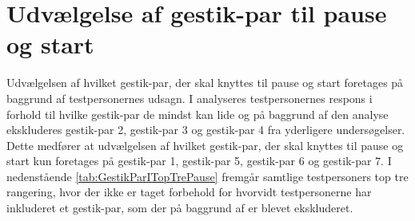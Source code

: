 \section{Udvælgelse af gestik-par til pause og start}
\label{TestresultaterPauseStart}
%
Udvælgelsen af hvilket gestik-par, der skal knyttes til pause og start foretages på baggrund af testpersonernes udsagn. I  analyseres testpersonernes respons i forhold til hvilke gestik-par de mindst kan lide og på baggrund af den analyse ekskluderes gestik-par 2, gestik-par 3 og gestik-par 4 fra yderligere undersøgelser. Dette medfører at udvælgelsen af hvilket gestik-par, der skal knyttes til pause og start kun foretages på gestik-par 1, gestik-par 5, gestik-par 6 og gestik-par 7. \blankline
%  
I nedenstående \autoref{tab:GestikParITopTrePause} fremgår samtlige testpersoners top tre rangering, hvor der ikke er taget forbehold for hvorvidt testpersonerne har inkluderet et gestik-par, som der på baggrund af  er blevet ekskluderet.
%

